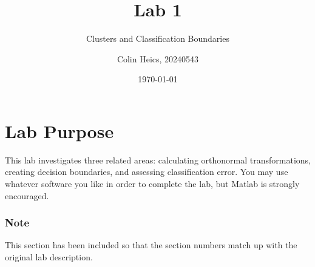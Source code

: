 \documentclass[article, 1.5space, letterpaper, 12pt, oneside, header, footer]{SydeClass}
\title{Lab 1}
\subtitle{Clusters and Classification Boundaries}
\author{Colin Heics, 20240543}
\date{\today}
\begin{document}




\section{Lab Purpose}
This lab investigates three related areas: calculating orthonormal transformations, creating decision boundaries, and assessing classification error. You may use whatever software you like in order to complete the lab, but Matlab is strongly encouraged.

\subsubsection{Note}
This section has been included so that the section numbers match up with the original lab description.















\end{document}
